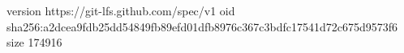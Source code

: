 version https://git-lfs.github.com/spec/v1
oid sha256:a2dcea9fdb25dd54849fb89efd01dfb8976c367c3bdfc17541d72c675d9573f6
size 174916
